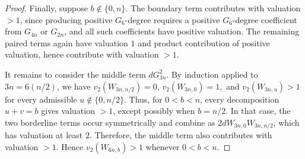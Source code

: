\documentclass[10pt,a4paper]{amsart}
\begin{document}
\begin{proof}
Finally, suppose $b\notin\{0,n\}$. The boundary term contributes with valuation $>1$, since producing positive $G_6$-degree requires a positive $G_6$-degree coefficient from $G_{4n}$ or $G_{2n}$, and all such coefficients have positive valuation. The remaining paired terms again have valuation $1$ and product contribution of positive valuation, hence contribute with valuation $>1$. 

It remains to consider the middle term $dG_{3n}^2$. By induction applied to
$3n=6(n/2)$, we have $v_2(W_{3n,n/2})=0$, $v_2(W_{3n,0})=1,$ and $v_2(W_{3n,u})>1$ for every admissible $u\notin\{0,n/2\}$. Thus, for $0<b<n$, every decomposition $u+v=b$ gives valuation $>1$, except possibly when $b=n/2$. In that case, the two borderline terms occur symmetrically and
combine as $2dW_{3n,0}W_{3n,n/2}$, which has valuation at least $2$. Therefore, the middle term also contributes
with valuation $>1$. Hence $v_2(W_{6n,b})>1$ whenever $0<b<n$.

\end{proof}
\end{document}
